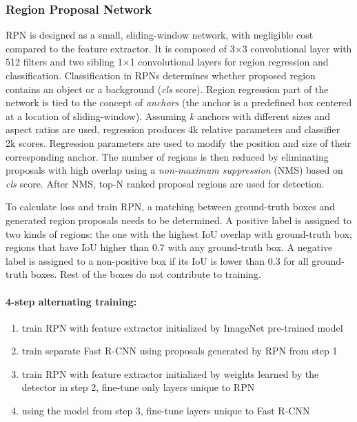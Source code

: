 \subsubsection{Region Proposal Network} 
 RPN is designed as a small, sliding-window network, with negligible cost compared to the feature extractor. It is composed of 3$\times$3 convolutional layer with 512 filters and two sibling 1$\times$1 convolutional layers for region regression and classification. Classification in RPNs determines whether proposed region contains an object or a background (\textit{cls} score). Region regression part of the network is tied to the concept of \textit{anchors} (the anchor is a predefined box centered at a location of sliding-window). Assuming \textit{k} anchors with different sizes and aspect ratios are used, regression produces 4k relative parameters and classifier 2k scores. Regression parameters are used to modify the position and size of their corresponding anchor. The number of regions is then reduced by eliminating proposals with high overlap using a \textit{non-maximum suppression} (NMS) based on \textit{cls} score. After NMS, top-N ranked proposal regions are used for detection.
 
 To calculate loss and train RPN, a matching between ground-truth boxes and generated region proposals needs to be determined. A positive label is assigned to two kinds of regions: the one with the highest IoU overlap with ground-truth box; regions that have IoU higher than 0.7 with any ground-truth box. A negative label is assigned to a non-positive box if its IoU is lower than 0.3 for all ground-truth boxes. Rest of the boxes do not contribute to training. 
 
 \paragraph{4-step alternating training:}
 
 \begin{enumerate}
     \item train RPN with feature extractor initialized by ImageNet pre-trained model
     \item train separate Fast R-CNN using proposals generated by RPN from step 1
     \item train RPN with feature extractor initialized by weights learned by the detector in step 2, fine-tune only layers unique to RPN
     \item using the model from step 3, fine-tune layers unique to Fast R-CNN
 \end{enumerate}

